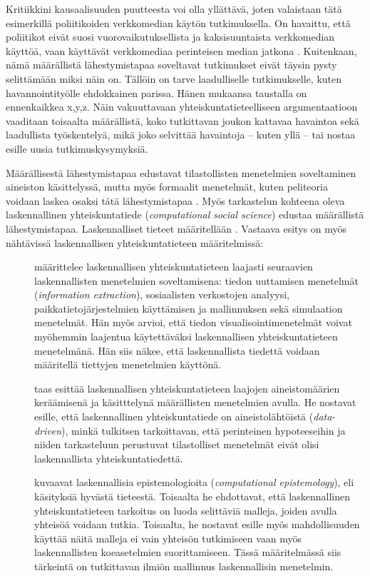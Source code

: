 \documentclass[finnish,gradu,twoside,12pt]{tktltiki}
\begin{document}
Kritiikkini kausaalisuuden puutteesta voi olla yllättävä, joten valaistaan tätä esimerkillä poliitikoiden verkkomedian käytön tutkimuksella. On havaittu, että poliitikot eivät suosi vuorovaikutuksellista ja kaksisuuntaista verkkomedian käyttöä, vaan käyttävät verkkomediaa perinteisen median jatkona \cite{a,b}. Kuitenkaan, nämä määrällistä lähestymistapaa soveltavat tutkimukset eivät täysin pysty selittämään miksi näin on. Tällöin on tarve laadulliselle tutkimukselle, kuten \cite{x} havannointityölle ehdokkainen parissa. Hänen mukaansa taustalla on ennenkaikkea x,y,z. Näin vakuuttavaan yhteiskuntatieteelliseen argumentaatioon vaaditaan toisaalta määrällistä, koko tutkittavan joukon kattavaa havaintoa sekä laadullista työskentelyä, mikä joko selvittää havaintoja -- kuten yllä -- tai nostaa esille uusia tutkimuskysymyksiä.

Määrällisestä lähestymistapaa edustavat tilastollisten menetelmien soveltaminen aineiston käsittelyssä, mutta myös formaalit menetelmät, kuten peliteoria voidaan laskea osaksi tätä lähestymistapaa \citep{a}. Myös tarkastelun kohteena oleva laskennallinen yhteiskuntatiede (\textit{computational social science}) edustaa määrällistä lähestymistapaa. Laskennalliset tieteet määritellään \citep{a,b,c}. Vastaava esitys on myös nähtävissä laskennallisen yhteiskuntatieteen määritelmissä:

\begin{description}
\item[\citet{cioffi-revilla10}] määrittelee laskennallisen yhteiskuntatieteen laajasti seuraavien laskennallisten menetelmien soveltamisena: tiedon uuttamisen menetelmät (\textit{information extraction}), sosiaalisten verkostojen analyysi, paikkatietojärjestelmien käyttämisen ja mallinnuksen sekä simulaation menetelmät. Hän myös arvioi, että tiedon visualisointimenetelmät voivat myöhemmin laajentua käytettäväksi laskennallisen yhteiskuntatieteen menetelmänä. Hän siis näkee, että laskennallista tiedettä voidaan määritellä tiettyjen menetelmien käyttönä.
\item[\citet{lazer09}] taas esittää laskennallisen yhteiskuntatieteen laajojen aineistomäärien keräämisenä ja käsitttelynä määrällisten menetelmien avulla. He nostavat esille, että laskennallinen yhteiskuntatiede on aineistolähtöistä (\textit{data-driven}), minkä tulkitsen tarkoittavan, että perinteinen hypoteeseihin ja niiden tarkasteluun perustuvat tilastolliset menetelmät eivät olisi laskennallista yhteiskuntatiedettä.
\item[\cite{bankes02}] kuvaavat laskennallisia epistemologioita (\textit{computational epistemology}), eli käsityksiä hyvästä tieteestä. Toisaalta he ehdottavat, että laskennallinen yhteiskuntatieteen tarkoitus on luoda selittäviä malleja, joiden avulla yhteisöä voidaan tutkia. Toisaalta, he nostavat esille myös mahdollisuuden käyttää näitä malleja ei vain yhteisön tutkimiseen vaan myös laskennallisten koeasetelmien suorittamiseen. Tässä määritelmässä siis tärkeintä on tutkittavan ilmiön mallinnus laskennallisin menetelmin.
\end{description}
\end{document}
